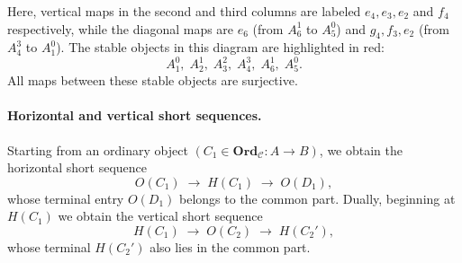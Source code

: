 \documentclass[11pt]{book}
\theoremstyle{definition}
\theoremstyle{plain}
\theoremstyle{remark}
\begin{document}
Here, vertical maps in the second and third columns are labeled $e_4, e_3, e_2$ and $f_4$ respectively, 
while the diagonal maps are $e_6$ (from $A^1_6$ to $A^0_5$) and $g_4,f_3,e_2$ (from $A^3_4$ to $A^0_1$).
The stable objects in this diagram are highlighted in red:
\[
\boxed{A^0_1, \; A^1_2, \; A^2_3, \; A^3_4, \; A^1_6, \; A^0_5}.
\]
All maps between these stable objects are surjective.



\paragraph{Horizontal and vertical short sequences.}
Starting from an ordinary object $(C_1\in \mathbf{Ord}_\mathcal C: A \longrightarrow B)$, we obtain the horizontal short sequence
\[
   O(C_1) \;\longrightarrow\; H(C_1) \;\longrightarrow\; O(D_1),
\]
whose terminal entry $O(D_1)$ belongs to the common part.  
Dually, beginning at $H(C_1)$ we obtain the vertical short sequence
\[
   H(C_1) \;\longrightarrow\; O(C_2) \;\longrightarrow\; H(C_2'),
\]
whose terminal $H(C_2')$ also lies in the common part.
\end{document}
